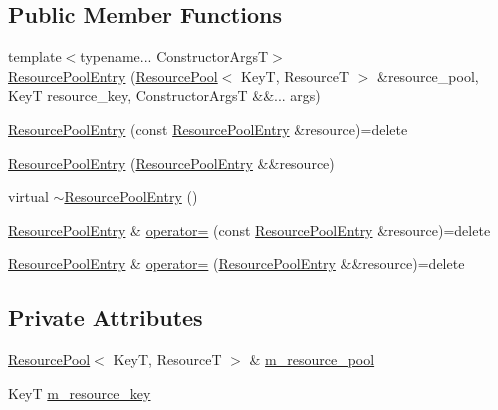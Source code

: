 \subsection*{Public Member Functions}
\begin{DoxyCompactItemize}
\item 
{\footnotesize template$<$typename... Constructor\+ArgsT$>$ }\\\hyperlink{structmage_1_1_resource_pool_1_1_resource_pool_entry_a8e255033a6f139f5f30e17869325eb2e}{Resource\+Pool\+Entry} (\hyperlink{classmage_1_1_resource_pool}{Resource\+Pool}$<$ KeyT, ResourceT $>$ \&resource\+\_\+pool, KeyT resource\+\_\+key, Constructor\+ArgsT \&\&... args)
\item 
\hyperlink{structmage_1_1_resource_pool_1_1_resource_pool_entry_a10ba1bc114b97a82fc957b17c3bef56e}{Resource\+Pool\+Entry} (const \hyperlink{structmage_1_1_resource_pool_1_1_resource_pool_entry}{Resource\+Pool\+Entry} \&resource)=delete
\item 
\hyperlink{structmage_1_1_resource_pool_1_1_resource_pool_entry_a9a6d3bb435ebc41ca6f78709e4f4cd39}{Resource\+Pool\+Entry} (\hyperlink{structmage_1_1_resource_pool_1_1_resource_pool_entry}{Resource\+Pool\+Entry} \&\&resource)
\item 
virtual \hyperlink{structmage_1_1_resource_pool_1_1_resource_pool_entry_ae8d7b54f633fb865e2c299d2fd2bf466}{$\sim$\+Resource\+Pool\+Entry} ()
\item 
\hyperlink{structmage_1_1_resource_pool_1_1_resource_pool_entry}{Resource\+Pool\+Entry} \& \hyperlink{structmage_1_1_resource_pool_1_1_resource_pool_entry_a2a08bf48f2dce191a23f088530879ca0}{operator=} (const \hyperlink{structmage_1_1_resource_pool_1_1_resource_pool_entry}{Resource\+Pool\+Entry} \&resource)=delete
\item 
\hyperlink{structmage_1_1_resource_pool_1_1_resource_pool_entry}{Resource\+Pool\+Entry} \& \hyperlink{structmage_1_1_resource_pool_1_1_resource_pool_entry_ab9de5fdfecd8e19a510541b9353fe854}{operator=} (\hyperlink{structmage_1_1_resource_pool_1_1_resource_pool_entry}{Resource\+Pool\+Entry} \&\&resource)=delete
\end{DoxyCompactItemize}
\subsection*{Private Attributes}
\begin{DoxyCompactItemize}
\item 
\hyperlink{classmage_1_1_resource_pool}{Resource\+Pool}$<$ KeyT, ResourceT $>$ \& \hyperlink{structmage_1_1_resource_pool_1_1_resource_pool_entry_a657a97767707dbb045f49440dff4c126}{m\+\_\+resource\+\_\+pool}
\item 
KeyT \hyperlink{structmage_1_1_resource_pool_1_1_resource_pool_entry_a2ca0b2ee479f64dbec5288a9a8b2b4c9}{m\+\_\+resource\+\_\+key}
\end{DoxyCompactItemize}


